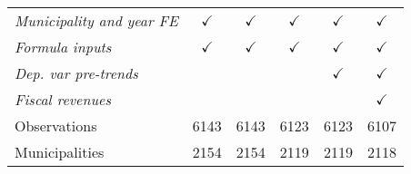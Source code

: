 \begin{tabular}{lccccc}
\textit{Municipality and year FE}    &	$\checkmark$   &   
										$\checkmark$   & 
										$\checkmark$   & 
										$\checkmark$   &
										$\checkmark$   \\

\textit{Formula inputs}  	& 	$\checkmark$    &   
								$\checkmark$    & 
								$\checkmark$    & 
								$\checkmark$    &
								$\checkmark$    \\

\textit{Dep. var pre-trends}  & 			    &   
												& 
												& 
								$\checkmark$    &
								$\checkmark$    \\

\textit{Fiscal revenues}  	& 					&   
												& 
												& 
												&
								$\checkmark$   \\


\midrule		


Observations 			&	 6143   &   
							 6143   & 
							 6123   & 
							 6123   &
							 6107   \\

Municipalities  		&    2154   &   
							 2154   & 
							 2119   & 
							 2119   &
							 2118   \\


\bottomrule

\end{tabular}%
